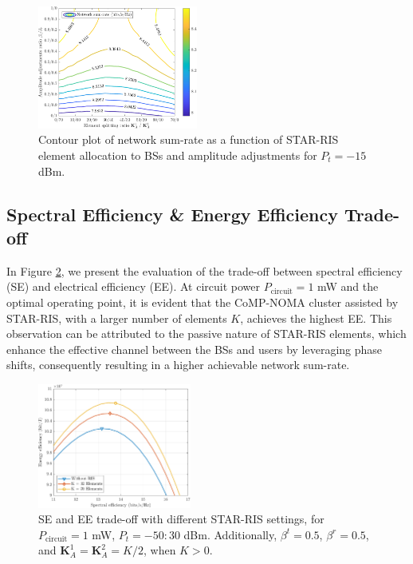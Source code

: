 \documentclass[conference]{IEEEtran}
\begin{document}
\begin{figure}[t!]
    \centering
    \includegraphics[width=0.47\textwidth]{figs/dynamic_s.pdf}
    \caption{Contour plot of network sum-rate as a function of STAR-RIS element allocation to BSs and amplitude adjustments for $P_t =-15$ dBm.}
    \label{fig:dynamic}
\end{figure}

\subsection{Spectral Efficiency \& Energy Efficiency Trade-off}
In Figure \ref{fig:se_vs_ee}, we present the evaluation of the trade-off between spectral efficiency (SE) and electrical efficiency (EE). At circuit power $P_{\text{circuit}} = 1$ mW and the optimal operating point, it is evident that the CoMP-NOMA cluster assisted by STAR-RIS, with a larger number of elements $K$, achieves the highest EE. This observation can be attributed to the passive nature of STAR-RIS elements, which enhance the effective channel between the BSs and users by leveraging phase shifts, consequently resulting in a higher achievable network sum-rate.
\begin{figure}[t!]
    \centering
    \includegraphics[width=0.45\textwidth]{figs/se_vs_ee.pdf}
    \caption{SE and EE trade-off with different STAR-RIS settings, for $P_{\text{circuit}} = 1$ mW, $P_t=-50:30$ dBm. Additionally, $\beta^t=0.5$, $\beta^r=0.5$, and $\textbf{K}_A^1=\textbf{K}_A^2=K/2$, when $K > 0$.}
    \label{fig:se_vs_ee}
\end{figure}
\end{document}
